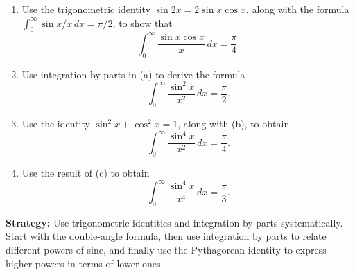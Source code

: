 \begin{problembox}
\begin{enumerate}[label=(\alph*)]
\item Use the trigonometric identity $\sin 2x = 2 \sin x \cos x$, along with the formula $\int_{0}^{\infty} \sin x/x \, dx = \pi/2$, to show that
\[\int_{0}^{\infty} \frac{\sin x \cos x}{x} \, dx = \frac{\pi}{4}.\]
\item Use integration by parts in (a) to derive the formula
\[\int_{0}^{\infty} \frac{\sin^2 x}{x^2} \, dx = \frac{\pi}{2}.\]
\item Use the identity $\sin^2 x + \cos^2 x = 1$, along with (b), to obtain
\[\int_{0}^{\infty} \frac{\sin^4 x}{x^2} \, dx = \frac{\pi}{4}.\]
\item Use the result of (c) to obtain
\[\int_{0}^{\infty} \frac{\sin^4 x}{x^4} \, dx = \frac{\pi}{3}.\]
\end{enumerate}
\end{problembox}

\noindent\textbf{Strategy:} Use trigonometric identities and integration by parts systematically. Start with the double-angle formula, then use integration by parts to relate different powers of sine, and finally use the Pythagorean identity to express higher powers in terms of lower ones.

